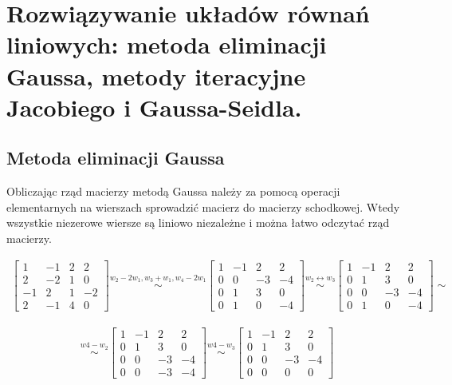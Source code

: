 \documentclass[main.tex]{subfiles}
\begin{document}
    \newpage

    \section{Rozwiązywanie układów równań liniowych: metoda eliminacji Gaussa, metody iteracyjne Jacobiego i Gaussa-Seidla.}

    \subsection{Metoda eliminacji Gaussa}

    Obliczając rząd macierzy metodą Gaussa należy za pomocą operacji elementarnych na wierszach sprowadzić macierz do
    macierzy schodkowej. Wtedy wszystkie niezerowe wiersze są liniowo niezależne i można łatwo odczytać rząd macierzy.

    \begin{align*}
        \begin{bmatrix}
            1 & -1 & 2 & 2\\
            2 & -2 & 1 & 0\\
            -1 & 2 & 1 & -2\\
            2 & -1 & 4 & 0
        \end{bmatrix}
        \stackrel{w_2 - 2w_1, w_3 + w_1, w_4 - 2w_1}{\sim}
        \begin{bmatrix}
            1 & -1 & 2 & 2\\
            0 & 0 & -3 & -4\\
            0 & 1 & 3 & 0\\
            0 & 1 & 0 & -4
        \end{bmatrix}
        \stackrel{w_2 \leftrightarrow w_3}{\sim}
        \begin{bmatrix}
            1 & -1 & 2 & 2\\
            0 & 1 & 3 & 0\\
            0 & 0 & -3 & -4\\
            0 & 1 & 0 & -4
        \end{bmatrix}
        \sim
    \end{align*}

    \begin{align*}
        \stackrel{w4 - w_2}{\sim}
        \begin{bmatrix}
            1 & -1 & 2 & 2\\
            0 & 1 & 3 & 0\\
            0 & 0 & -3 & -4\\
            0 & 0 & -3 & -4
        \end{bmatrix}
        \stackrel{w4 - w_3}{\sim}
        \begin{bmatrix}
            1 & -1 & 2 & 2\\
            0 & 1 & 3 & 0\\
            0 & 0 & -3 & -4\\
            0 & 0 & 0 & 0
        \end{bmatrix}
    \end{align*}
\end{document}
